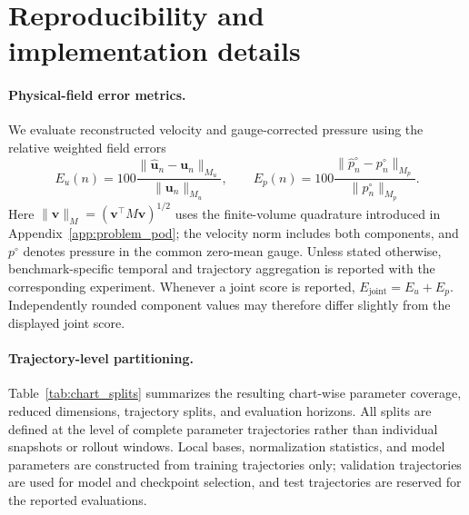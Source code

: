 \section{Reproducibility and implementation details}
\label{app:implementation}

\paragraph{Physical-field error metrics.}
We evaluate reconstructed velocity and gauge-corrected pressure using the relative weighted field errors
\begin{equation}
E_u(n)
=
100\frac{
\|\widehat{\bm u}_n-\bm u_n\|_{M_u}
}{
\|\bm u_n\|_{M_u}
},
\qquad
E_p(n)
=
100\frac{
\|\widehat p_n^\circ-p_n^\circ\|_{M_p}
}{
\|p_n^\circ\|_{M_p}
}.
\label{eq:field_errors}
\end{equation}
Here $\|\bm v\|_M=(\bm v^\top M\bm v)^{1/2}$ uses the finite-volume
quadrature introduced in Appendix~\ref{app:problem_pod}; the velocity norm includes both components, and $p^\circ$ denotes pressure in the common zero-mean gauge. Unless stated otherwise, benchmark-specific temporal and trajectory aggregation is reported with the corresponding experiment. Whenever a joint score is reported,
$E_{\mathrm{joint}}=E_u+E_p$. Independently rounded component values may therefore differ slightly from the displayed joint score.


\paragraph{Trajectory-level partitioning.}
Table~\ref{tab:chart_splits} summarizes the resulting chart-wise parameter coverage, reduced dimensions, trajectory splits, and evaluation horizons. All splits are defined at the level of complete parameter trajectories rather than individual snapshots or rollout windows. Local bases, normalization statistics, and model parameters are constructed from training trajectories only; validation trajectories are used for model and checkpoint selection, and test trajectories are reserved for the reported evaluations. 

